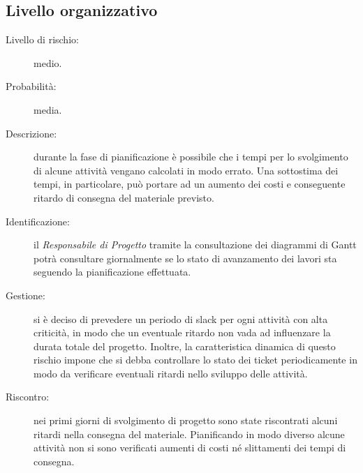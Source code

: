 \subsection{Livello organizzativo}
\begin{description}
	\item[Livello di rischio:] medio.
	\item[Probabilità:] media.
	\item[Descrizione:] durante la fase di pianificazione è possibile che i tempi per lo svolgimento di alcune attività vengano calcolati in modo errato. Una sottostima dei tempi, in particolare, può portare ad un aumento dei costi e conseguente ritardo di consegna del materiale previsto. 
	\item[Identificazione:] il \textit{Responsabile di Progetto} tramite la consultazione dei diagrammi di \gls{Gantt} potrà consultare giornalmente se lo stato di avanzamento dei lavori sta seguendo la pianificazione effettuata.
	\item[Gestione:] si è deciso di prevedere un periodo di \gls{slack} per ogni attività con alta criticità, in modo che un eventuale ritardo non vada ad influenzare la durata totale del progetto. Inoltre, la caratteristica dinamica di questo rischio impone che si debba controllare lo stato dei \gls{ticket} periodicamente in modo da verificare eventuali ritardi nello sviluppo delle attività. 
	\item[Riscontro:] nei primi giorni di svolgimento di progetto sono state riscontrati alcuni ritardi nella consegna del materiale. Pianificando in modo diverso alcune attività non si sono verificati aumenti di costi né slittamenti dei tempi di consegna. 
\end{description}


